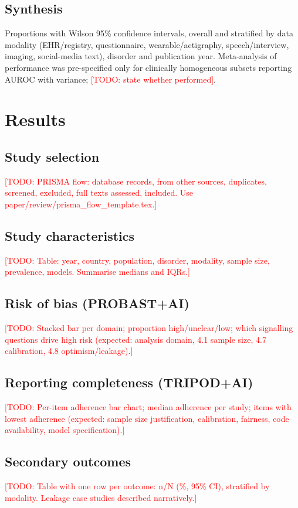 \documentclass[11pt,a4paper]{article}
\newcommand{\todo}[1]{\textcolor{red}{[TODO: #1]}}
\begin{document}
\subsection{Synthesis}
Proportions with Wilson 95\% confidence intervals, overall and stratified by data modality
(EHR/registry, questionnaire, wearable/actigraphy, speech/interview, imaging, social-media text),
disorder and publication year. Meta-analysis of performance was pre-specified only for
clinically homogeneous subsets reporting AUROC with variance; \todo{state whether performed}.

\section{Results}
\subsection{Study selection}
\todo{PRISMA flow: \nDb{} database records, \nOther{} from other sources, \nDup{} duplicates,
\nScreened{} screened, \nExclTA{} excluded, \nAssessed{} full texts assessed, \nIncluded{} included.
Use paper/review/prisma\_flow\_template.tex.}
\subsection{Study characteristics}
\todo{Table: year, country, population, disorder, modality, sample size, prevalence, models. Summarise medians and IQRs.}
\subsection{Risk of bias (PROBAST+AI)}
\todo{Stacked bar per domain; proportion high/unclear/low; which signalling questions drive high risk (expected: analysis domain, 4.1 sample size, 4.7 calibration, 4.8 optimism/leakage).}
\subsection{Reporting completeness (TRIPOD+AI)}
\todo{Per-item adherence bar chart; median adherence per study; items with lowest adherence (expected: sample size justification, calibration, fairness, code availability, model specification).}
\subsection{Secondary outcomes}
\todo{Table with one row per outcome: n/N (\%, 95\% CI), stratified by modality. Leakage case studies described narratively.}
\end{document}
